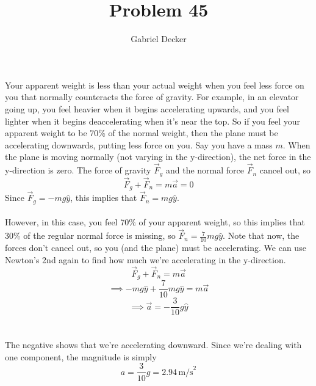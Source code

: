 \documentclass[12pt]{article}
\title{Problem 45}
\author{Gabriel Decker}
\begin{document}
\maketitle
\begin{flushleft}



Your apparent weight is less than your actual weight when you feel less force on you that normally counteracts the force of gravity.
For example, in an elevator going up, you feel heavier when it begins accelerating upwards, and you feel lighter when it begins deaccelerating when it's near the top.
So if you feel your apparent weight to be 70\% of the normal weight, then the plane must be accelerating downwards, putting less force on you.
Say you have a mass $m$. When the plane is moving normally (not varying in the y-direction), the net force in the y-direction is zero.
The force of gravity $\vec{F}_g$ and the normal force $\vec{F}_n$ cancel out, so
$$\vec{F}_g+\vec{F}_n=m\vec{a}=0$$
Since $\vec{F}_g=-mg\hat{y}$, this implies that $\vec{F}_n=mg\hat{y}$.\\~\\

However, in this case, you feel 70\% of your apparent weight, so this implies that 30\% of the regular normal force is missing, so $\vec{F}_n=\frac{7}{10}mg\hat{y}$.
Note that now, the forces don't cancel out, so you (and the plane) must be accelerating.
We can use Newton's 2nd again to find how much we're accelerating in the y-direction.
$$\vec{F}_g+\vec{F}_n=m\vec{a}$$
$$\implies-mg\hat{y}+\frac{7}{10}mg\hat{y}=m\vec{a}$$
$$\implies\vec{a}=-\frac{3}{10}g\hat{y}$$\\~\\

The negative shows that we're accelerating downward.
Since we're dealing with one component, the magnitude is simply
$$a=\frac{3}{10}g=2.94\,\text{m/s}^2$$




\end{flushleft}
\end{document}
